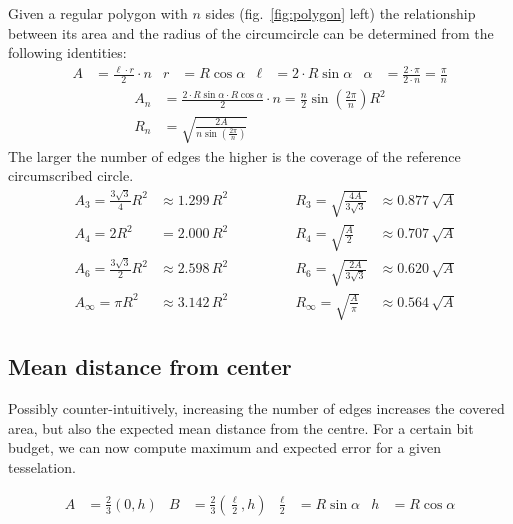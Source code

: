 \documentclass{article}
\begin{document}
Given a regular polygon with $n$ sides (fig.~\ref{fig:polygon} left) the relationship between its area and the radius of the circumcircle can be determined from the following identities:
%
\begin{align*}
A &= \frac{\ell \cdot r}{2} \cdot n &
r &= R \cos \alpha &
\ell &= 2 \cdot R \sin \alpha &
\alpha &= \frac{2 \cdot \pi}{ 2 \cdot n} = \frac{\pi}{n}
\end{align*}
%
\begin{align}
A_n &= \frac{2 \cdot R \sin \alpha \cdot R \cos \alpha}{2} \cdot n = %
\frac{n}{2} \sin \left( \frac{2 \pi}{n} \right) R^2 \label{eq:area} \\
R_n &= \sqrt{ \frac{2 A}{n \sin \left( \frac{2 \pi}{n} \right)} } \label{eq:radius} 
\end{align}
%
The larger the number of edges the higher is the coverage of the reference circumscribed circle.
%
\begin{align*}
&A_3 = %
\frac{3 \sqrt{3}}{4} R^2 &\approx 1.299 \, R^2 \qquad\qquad &R_3 = \sqrt{ \frac{4 A}{3 \sqrt{3}}} &\approx 0.877 \, \sqrt{A} \\
&A_4 = %
2 R^2 &= 2.000 \, R^2 \qquad\qquad &R_4 = \sqrt{ \frac{A}{2}} &\approx 0.707 \, \sqrt{A} \\
&A_6 = %
\frac{3 \sqrt{3}}{2} R^2 &\approx 2.598 \, R^2 \qquad\qquad &R_6 = \sqrt{ \frac{2 A}{3 \sqrt{3}}} &\approx 0.620 \, \sqrt{A} \\
&A_\infty = \pi R^2 &\approx 3.142 \, R^2 \qquad\qquad &R_\infty = \sqrt{ \frac{A}{\pi}} &\approx 0.564 \, \sqrt{A}
\end{align*}


\subsection{Mean distance from center}

Possibly counter-intuitively, increasing the number of edges increases the covered area, but also the expected mean distance from the centre. For a certain bit budget, we can now compute maximum and expected error for a given tesselation.

\begin{align*}
A &= \frac{2}{3} \left( 0, h \right) &
B &= \frac{2}{3} \left( \frac{\ell}{2}, h \right) &
\frac{\ell}{2} &= R \sin \alpha &
h &= R \cos \alpha
\end{align*}
\end{document}
